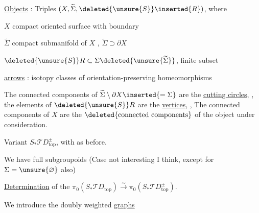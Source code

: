 \uline{Objects} : Triples $(X,\widetilde\Sigma,
\deleted{\unsure{S}}\inserted{R})$, where

$X$ compact oriented surface with boundary

$\widetilde\Sigma$ compact submanifold of $X$
, $\widetilde\Sigma\supset\partial X$

$\deleted{\unsure{S}}R\subset\Sigma\deleted{\unsure{\widetilde\Sigma}}$,
finite subset


\uline{arrows} : isotopy classes of orientation-preserving homeomorphisms

The connected components of $\widetilde\Sigma\setminus\partial X
\inserted{=\Sigma}$ are the \uline{cutting circles},
,
the elements of $\deleted{\unsure{S}}R$ are the
 \uline{
vertices},
,
The connected components of $X$ are the
$\deleted{\text{connected components}}$
of the object under consideration.

Variant $S_*\mathcal TD_{\mathrm{top}}^\pm$, with
as before.

We have full subgroupoids
(Case not interesting I think, except for $\Sigma=\unsure{\varnothing}$
also)


 \uline{Determination} of the
$\pi_0(S_*\mathcal TD_{\mathrm{top}})
 \xrightarrow{\sim}\pi_0(S_*\mathcal TD^\pm_{\mathrm{top}})$.

We introduce the doubly weighted \uline{graphs} 

